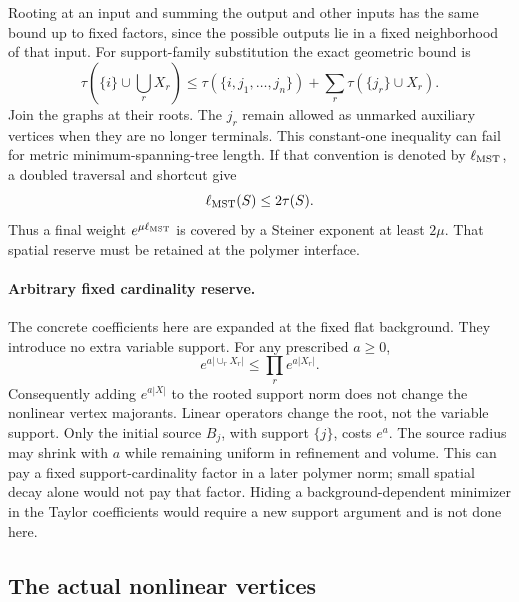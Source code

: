 \documentclass[11pt]{article}
\theoremstyle{remark}
\begin{document}
Rooting at an input and summing the output and other inputs
has the same bound up to fixed factors, since the possible
outputs lie in a fixed neighborhood of that input.
For support-family substitution the exact geometric bound is
\begin{equation}\label{cv-tree-union}
 \tau\left(\{i\}\cup\bigcup_rX_r\right)
 \le\tau(\{i,j_1,\ldots,j_n\})
                    +\sum_r\tau(\{j_r\}\cup X_r).
\end{equation}
Join the graphs at their roots. The $j_r$ remain allowed as
unmarked auxiliary vertices when they are no longer terminals.
This constant-one inequality can fail for metric
minimum-spanning-tree length. If that convention is denoted
by $\ell_{\rm MST}$, a doubled traversal and shortcut give
\begin{equation}\label{cv-mst-conversion}
 \ell_{\rm MST}(S)\le2\tau(S).
\end{equation}
Thus a final weight $e^{\mu\ell_{\rm MST}}$ is covered by
a Steiner exponent at least $2\mu$. That spatial reserve
must be retained at the polymer interface.

\paragraph{Arbitrary fixed cardinality reserve.}
The concrete coefficients here are expanded at the fixed
flat background. They introduce no extra variable support.
For any prescribed $a\ge0$,
\begin{equation}\label{cv-cardinality}
 e^{a|\cup_rX_r|}\le\prod_re^{a|X_r|}.
\end{equation}
Consequently adding $e^{a|X|}$ to the rooted support norm
does not change the nonlinear vertex majorants. Linear
operators change the root, not the variable support. Only
the initial source $B_j$, with support $\{j\}$, costs
$e^a$. The source radius may shrink with $a$ while remaining
uniform in refinement and volume. This can pay a fixed
support-cardinality factor in a later polymer norm; small
spatial decay alone would not pay that factor. Hiding a
background-dependent minimizer in the Taylor coefficients
would require a new support argument and is not done here.

\subsection{The actual nonlinear vertices}
\label{cv-concrete-section}
\end{document}
